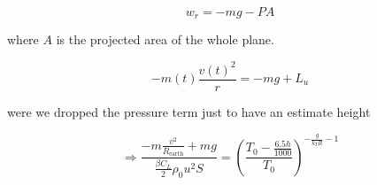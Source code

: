 \documentclass{article}
\begin{document}
\begin{equation}
    w_r=-mg -PA 
\end{equation}

where $A$ is the projected area of the whole plane.

\begin{equation}
    -m(t)\frac{v(t)^2}{r}=-mg+ L_u
\end{equation}

were we dropped the pressure term just to have an estimate height

\begin{equation}
  \Rightarrow \frac{-m\frac{v^2}{R_{\text{earth}}} +mg}{\frac{\beta C_L}{2} \rho_0 u^2S}=  \left(\frac{T_0-\frac{6.5h}{1000}}{T_0}\right)^{-\frac{g}{k_TR}-1}    
\end{equation}

\printbibliography
\end{document}
